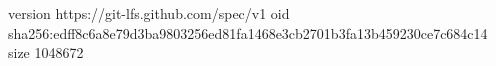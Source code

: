 version https://git-lfs.github.com/spec/v1
oid sha256:edff8c6a8e79d3ba9803256ed81fa1468e3cb2701b3fa13b459230ce7c684c14
size 1048672
